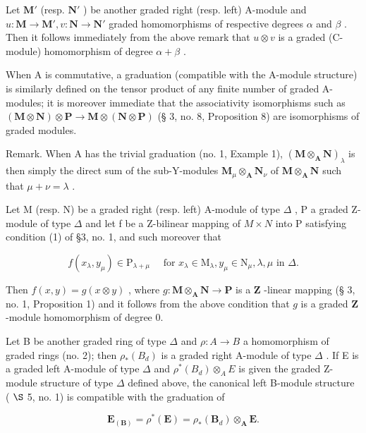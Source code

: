 Let \(\mathbf{M}'\) (resp. \(\mathbf{N}'\) ) be another graded right (resp. left) A-module and \(u: \mathbf{M} \to \mathbf{M}', v: \mathbf{N} \to \mathbf{N}'\) graded homomorphisms of respective degrees \(\alpha\) and \(\beta\) . Then it follows immediately from the above remark that \(u \otimes v\) is a graded (C-module) homomorphism of degree \(\alpha + \beta\) .

When A is commutative, a graduation (compatible with the A-module structure) is similarly defined on the tensor product of any finite number of graded A-modules; it is moreover immediate that the associativity isomorphisms such as \((\mathbf{M} \otimes \mathbf{N}) \otimes \mathbf{P} \to \mathbf{M} \otimes (\mathbf{N} \otimes \mathbf{P})\) (§ 3, no. 8, Proposition 8) are isomorphisms of graded modules.

Remark. When A has the trivial graduation (no. 1, Example 1), \((\mathbf{M} \otimes_{\mathbf{A}} \mathbf{N})_{\lambda}\) is then simply the direct sum of the sub-Y-modules \(\mathbf{M}_{\mu} \otimes_{\mathbf{A}} \mathbf{N}_{\nu}\) of \(\mathbf{M} \otimes_{\mathbf{A}} \mathbf{N}\) such that \(\mu + \nu = \lambda\) .

Let M (resp. N) be a graded right (resp. left) A-module of type \(\Delta\) , P a graded Z-module of type \(\Delta\) and let f be a Z-bilinear mapping of \(M \times N\) into P satisfying condition (1) of §3, no. 1, and such moreover that

\[
f (x _ {\lambda}, y _ {\mu}) \in \mathrm{P} _ {\lambda + \mu} \quad \text { for } x _ {\lambda} \in \mathrm{M} _ {\lambda}, y _ {\mu} \in \mathrm{N} _ {\mu}, \lambda , \mu \text { in } \Delta .
\]

Then \(f(x, y) = g(x \otimes y)\) , where \(g: \mathbf{M} \otimes_{\mathbf{A}} \mathbf{N} \to \mathbf{P}\) is a \(\mathbf{Z}\) -linear mapping (§ 3, no. 1, Proposition 1) and it follows from the above condition that \(g\) is a graded \(\mathbf{Z}\) -module homomorphism of degree 0.

Let B be another graded ring of type \(\Delta\) and \(\rho: A \to B\) a homomorphism of graded rings (no. 2); then \(\rho_*(B_d)\) is a graded right A-module of type \(\Delta\) . If E is a graded left A-module of type \(\Delta\) and \(\rho^*(B_d) \otimes_A E\) is given the graded Z-module structure of type \(\Delta\) defined above, the canonical left B-module structure ( \(\S\) 5, no. 1) is compatible with the graduation of

\[
\mathbf {E} _ {(\mathbf {B})} = \rho^ {*} (\mathbf {E}) = \rho_ {*} (\mathbf {B} _ {d}) \otimes_ {\mathbf {A}} \mathbf {E}.
\]

